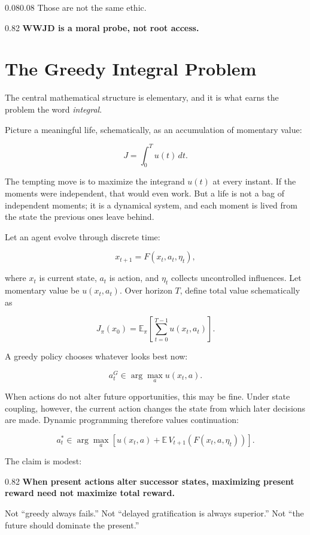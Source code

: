 \documentclass[10pt,letterpaper]{article}
\newenvironment{paperbody}
  {\begin{adjustwidth}{0.08\textwidth}{0.08\textwidth}\justifying}
  {\par\end{adjustwidth}}
\newenvironment{thesisbox}
  {\Needspace{3.5\baselineskip}\par\vspace{0.32em}\begin{center}\begingroup
   \begin{lrbox}{\thesisboxsave}\begin{varwidth}{0.82\linewidth}
   \normalsize\rmfamily\bfseries\upshape\RaggedRight}
  {\end{varwidth}\end{lrbox}\fbox{\usebox{\thesisboxsave}}
   \endgroup\end{center}\vspace{0.32em}}
\let\oldsection\section
\renewcommand{\section}{\Needspace{6\baselineskip}\oldsection}
\begin{document}
\begin{paperbody}
Those are not the same ethic.

\begin{thesisbox}
WWJD is a moral probe, not root access.
\end{thesisbox}

\section{The Greedy Integral
Problem}\label{the-greedy-integral-problem}

The central mathematical structure is elementary, and it is what earns
the problem the word \emph{integral}.

Picture a meaningful life, schematically, as an accumulation of momentary
value:

\[
J=\int_0^T u(t)\,dt.
\]

The tempting move is to maximize the integrand \(u(t)\) at every instant.
If the moments were independent, that would even work. But a life is not
a bag of independent moments; it is a dynamical system, and each moment
is lived from the state the previous ones leave behind.

Let an agent evolve through discrete time:

\[
x_{t+1}=F(x_t,a_t,\eta_t),
\]

where \(x_t\) is current state, \(a_t\) is action, and \(\eta_t\)
collects uncontrolled influences. Let momentary value be \(u(x_t,a_t)\).
Over horizon \(T\), define total value schematically as

\[
J_\pi(x_0)=
\mathbb E_\pi
\left[
\sum_{t=0}^{T-1}u(x_t,a_t)
\right].
\]

A greedy policy chooses whatever looks best now:

\[
a_t^G\in\arg\max_a u(x_t,a).
\]

When actions do not alter future opportunities, this may be fine. Under
state coupling, however, the current action changes the state from which
later decisions are made. Dynamic programming therefore values
continuation:

\[
a_t^*\in\arg\max_a
\left[
u(x_t,a)+
\mathbb E\,V_{t+1}(F(x_t,a,\eta_t))
\right].
\]

The claim is modest:

\begin{thesisbox}
When present actions alter successor states, maximizing present
reward need not maximize total reward.
\end{thesisbox}

Not ``greedy always fails.'' Not ``delayed gratification is always
superior.'' Not ``the future should dominate the present.''


\end{paperbody}
\end{document}
